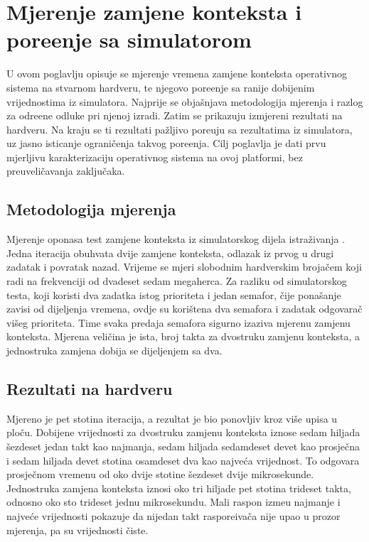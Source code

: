 \chapter{Mjerenje zamjene konteksta i pore\dj{}enje sa simulatorom}
\label{ch:mjerenje}

U ovom poglavlju opisuje se mjerenje vremena zamjene konteksta operativnog
sistema na stvarnom hardveru, te njegovo pore\dj{}enje sa ranije dobijenim
vrijednostima iz simulatora. Najprije se obja\v{s}njava metodologija mjerenja i
razlog za odre\dj{}ene odluke pri njenoj izradi. Zatim se prikazuju izmjereni
rezultati na hardveru. Na kraju se ti rezultati pa\v{z}ljivo pore\dj{}uju sa
rezultatima iz simulatora, uz jasno isticanje ograni\v{c}enja takvog pore\dj{}enja.
Cilj poglavlja je dati prvu mjerljivu karakterizaciju operativnog sistema na
ovoj platformi, bez preuveli\v{c}avanja zaklju\v{c}aka.

\section{Metodologija mjerenja}
\label{sec:mjerenje-metoda}

Mjerenje oponasa test zamjene konteksta iz simulatorskog dijela istra\v{z}ivanja
\citep{thesisqemu}. Jedna iteracija obuhvata dvije zamjene konteksta, odlazak iz
prvog u drugi zadatak i povratak nazad. Vrijeme se mjeri slobodnim hardverskim
broja\v{c}em koji radi na frekvenciji od dvadeset sedam megaherca. Za razliku od
simulatorskog testa, koji koristi dva zadatka istog prioriteta i jedan semafor,
\v{c}ije pona\v{s}anje zavisi od dijeljenja vremena, ovdje su kori\v{s}tena dva
semafora i zadatak odgovara\v{c} vi\v{s}eg prioriteta. Time svaka predaja semafora
sigurno izaziva mjerenu zamjenu konteksta. Mjerena veli\v{c}ina je ista, broj
takta za dvostruku zamjenu konteksta, a jednostruka zamjena dobija se dijeljenjem
sa dva.

\section{Rezultati na hardveru}
\label{sec:mjerenje-rezultati}

Mjereno je pet stotina iteracija, a rezultat je bio ponovljiv kroz vi\v{s}e
upisa u plo\v{c}u. Dobijene vrijednosti za dvostruku zamjenu konteksta iznose
sedam hiljada \v{s}ezdeset jedan takt kao najmanja, sedam hiljada sedamdeset
devet kao prosje\v{c}na i sedam hiljada devet stotina osamdeset dva kao najve\'ca
vrijednost. To odgovara prosje\v{c}nom vremenu od oko dvije stotine \v{s}ezdeset
dvije mikrosekunde. Jednostruka zamjena konteksta iznosi oko tri hiljade pet
stotina trideset takta, odnosno oko sto trideset jednu mikrosekundu. Mali raspon
izme\dj{}u najmanje i najve\'ce vrijednosti pokazuje da nijedan takt
raspore\dj{}iva\v{c}a nije upao u prozor mjerenja, pa su vrijednosti \v{c}iste.

